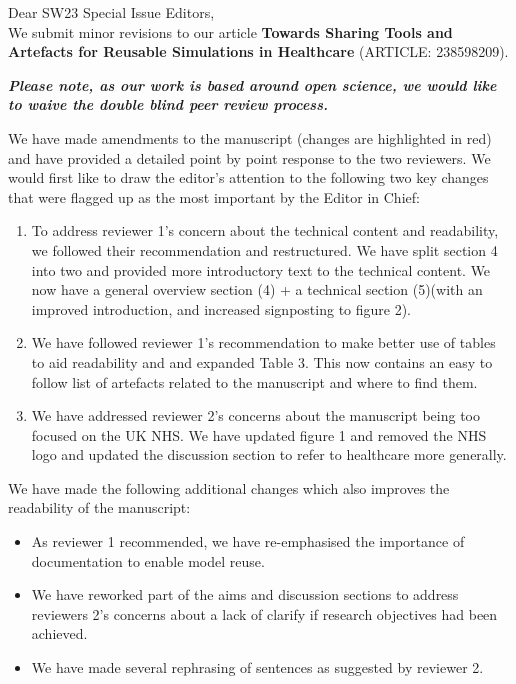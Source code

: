 \documentclass{article}
\begin{document}
\noindent Dear SW23 Special Issue Editors,
\\



We submit minor revisions to our article \textbf{Towards Sharing Tools and Artefacts for Reusable Simulations in Healthcare} (ARTICLE: 238598209). 

\textit{\textbf{Please note, as our work is based around open science, we would like to waive the double blind peer review process.}}

We have made amendments to the manuscript (changes are highlighted in red) and have provided a detailed point by point response to the two reviewers.  We would first like to draw the editor's attention to the following two key changes that were flagged up as the most important by the Editor in Chief:

\begin{enumerate}
    \item To address reviewer 1's concern about the technical content and readability, we followed their recommendation and restructured. We  have split section 4 into two and provided more introductory text to the technical content.  We now have a general overview section (4) + a technical section (5)(with an improved introduction, and increased signposting to figure 2). 
    \item We have followed reviewer 1's recommendation to make better use of tables to aid readability and and expanded Table 3. This now contains an easy to follow list of artefacts related to the manuscript and where to find them.
 \item We have addressed reviewer 2's concerns about the manuscript being too focused on the UK NHS.  We have updated figure 1 and removed the NHS logo and updated the discussion section to refer to healthcare more generally.

\end{enumerate}

We have made the following additional changes which also improves the readability of the manuscript:

\begin{itemize}
    \item As reviewer 1 recommended, we have re-emphasised the importance of documentation to enable model reuse.
    \item We have reworked part of the aims and discussion sections to address reviewers 2's concerns about a lack of clarify if research objectives had been achieved.
    \item We have made several rephrasing of sentences as suggested by reviewer 2.

\end{itemize}
\end{document}
